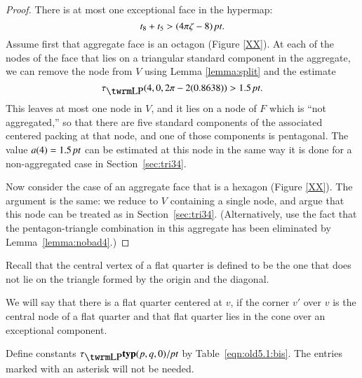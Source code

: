 \begin{proof}
There is at most one exceptional face in the hypermap:
    $$t_8 + t_5 > (4\pi\zeta-8)\,\hbox{\it pt}.$$
Assume first that aggregate face is an octagon (Figure
\ref{XX}). At each of the nodes of the face that lies on a
triangular standard component in the aggregate, we can remove the node
from $V$ using Lemma \ref {lemma:split} and the estimate
    $$\tauLP(4,0,2\pi-2 (0.8638)) > 1.5\,\pt.$$
This leaves at most one node in $V$, and it lies on a node of $F$
which is ``not aggregated,'' so that there are five standard
components of the associated centered packing at that node, and one
of those components is pentagonal.  The value $a(4)=1.5\,\hbox{\it pt}$ can be
estimated at this node in the same way it is done for a
non-aggregated case in Section~\ref{sec:tri34}.

Now consider the case of an aggregate face that is a hexagon (Figure
\ref{XX}).  The argument is the same: we reduce to $V$
containing a single node, and argue that this node can be treated as
in Section~\ref{sec:tri34}.  (Alternatively, use the fact that the
pentagon-triangle combination in this aggregate has been eliminated
by Lemma~\ref{lemma:nobad4}.)
\end{proof}



Recall that the central vertex of a flat quarter is defined to be
the one that does not lie on the triangle formed by the origin and
the diagonal.
%


We will say that there is a flat quarter centered at $v$, if
the corner $v'$ over $v$ is the central node of a flat quarter and
that flat quarter lies in the cone over an exceptional component.




Define constants $\tlp{\pqr{(p,q,0)}}/\pt$ by Table~\ref{eqn:old5.1:bis}. The
entries marked with an asterisk will not be needed.
%

